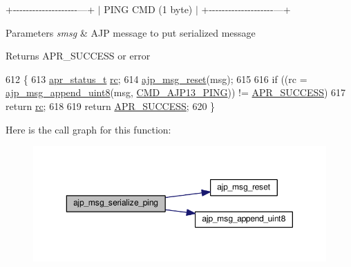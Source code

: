 +-\/-\/-\/-\/-\/-\/-\/-\/-\/-\/-\/-\/-\/-\/-\/-\/-\/-\/-\/-\/---+ $\vert$ P\+I\+NG C\+MD (1 byte) $\vert$ +-\/-\/-\/-\/-\/-\/-\/-\/-\/-\/-\/-\/-\/-\/-\/-\/-\/-\/-\/-\/---+


\begin{DoxyParams}{Parameters}
{\em smsg} & A\+JP message to put serialized message \\
\hline
\end{DoxyParams}
\begin{DoxyReturn}{Returns}
A\+P\+R\+\_\+\+S\+U\+C\+C\+E\+SS or error 
\end{DoxyReturn}

\begin{DoxyCode}
612 \{
613     \hyperlink{group__apr__errno_gaa5105fa83cc322f09382292db8b47593}{apr\_status\_t} \hyperlink{group__APACHE__CORE__CONFIG_ga2e051c0ce9ee165170cd7973f2464512}{rc};
614     \hyperlink{group__AJP__api_gac85c7fdc0995b29207d13c7ea35b3f1e}{ajp\_msg\_reset}(msg);
615 
616     \textcolor{keywordflow}{if} ((rc = \hyperlink{group__AJP__api_ga3afb22b56fa344c93861e6090b044568}{ajp\_msg\_append\_uint8}(msg, \hyperlink{group__AJP__defines_ga6c967e7bca128a8e6db0d30dd67173fe}{CMD\_AJP13\_PING})) != 
      \hyperlink{group__apr__errno_ga9ee311b7bf1c691dc521d721339ee2a6}{APR\_SUCCESS})
617         \textcolor{keywordflow}{return} \hyperlink{group__APACHE__CORE__CONFIG_ga2e051c0ce9ee165170cd7973f2464512}{rc};
618 
619     \textcolor{keywordflow}{return} \hyperlink{group__apr__errno_ga9ee311b7bf1c691dc521d721339ee2a6}{APR\_SUCCESS};
620 \}
\end{DoxyCode}


Here is the call graph for this function\+:
\nopagebreak
\begin{figure}[H]
\begin{center}
\leavevmode
\includegraphics[width=350pt]{group__AJP__api_ga9154ecb9e4c48fb4dce582a84cb6ba29_cgraph}
\end{center}
\end{figure}


